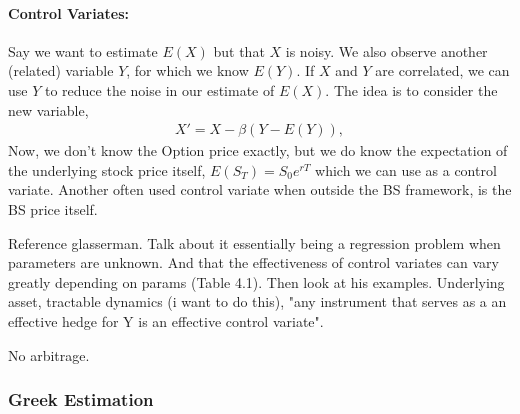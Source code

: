 \paragraph{Control Variates:}
Say we want to estimate $E(X)$ but that $X$ is noisy. We also observe another (related) variable $Y$, for which we know $E(Y)$. If $X$ and $Y$ are correlated, we can use $Y$ to reduce the noise in our estimate of $E(X)$. The idea is to consider the new variable,
\begin{align*}
    X' = X - \beta(Y - E(Y)),
\end{align*}
Now, we don't know the Option price exactly, but we do know the expectation of the underlying stock price itself, $E(S_T) = S_0 e^{rT}$ which we can use as a control variate. Another often used control variate when outside the BS framework, is the BS price itself. 

Reference glasserman. Talk about it essentially being a regression problem when parameters are unknown. And that the effectiveness of control variates can vary greatly depending on params (Table 4.1). Then look at his examples. Underlying asset, tractable dynamics (i want to do this), "any instrument that serves as a an effective hedge for Y is an effective control variate".

No arbitrage. 

\subsubsection{Greek Estimation}
